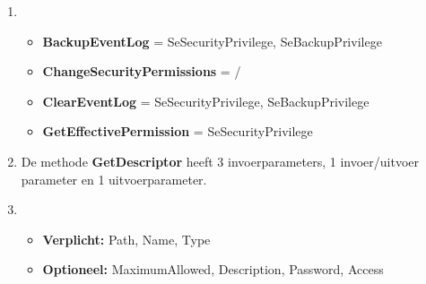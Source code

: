 \documentclass{report}
\begin{document}
\begin{enumerate}
		\item 
			\begin{itemize}
				\item 	\textbf{BackupEventLog} = SeSecurityPrivilege, SeBackupPrivilege
				\item 	\textbf{ChangeSecurityPermissions} = /
				\item 	\textbf{ClearEventLog} = SeSecurityPrivilege, SeBackupPrivilege
				\item 	\textbf{GetEffectivePermission} = SeSecurityPrivilege
			\end{itemize}
		\item De methode \textbf{GetDescriptor} heeft 3 invoerparameters, 1 invoer/uitvoer parameter en 1 uitvoerparameter.
		\item \begin{itemize}
			\item \textbf{Verplicht:} Path, Name, Type
			\item \textbf{Optioneel:} MaximumAllowed, Description, Password, Access
		\end{itemize}
	\end{enumerate}
\end{document}

